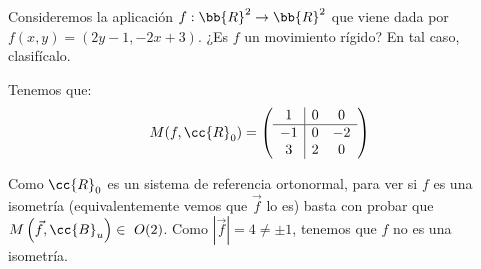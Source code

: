 \begin{ejercicio}
    Consideremos la aplicación $f : \bb{R}^2 \to \bb{R}^2$ que viene dada por $f(x, y) = (2y - 1, -2x + 3)$. ¿Es $f$ un movimiento rígido? En tal caso, clasifícalo.

    Tenemos que:
    \begin{equation*}
        M(f,\cc{R}_0) = \left(
        \begin{array}{c|cc}
            1 & 0 & 0 \\ \hline
            -1 & 0 & -2 \\
            3 & 2 & 0 \\
        \end{array}
        \right)
    \end{equation*}

    Como $\cc{R}_0$ es un sistema de referencia ortonormal, para ver si $f$ es una isometría (equivalentemente vemos que $\vec{f}$ lo es) basta con probar que
    $M\left(\vec{f}, \cc{B}_u\right)\in~O(2)$. Como $\left|\vec{f}\right|=4\neq \pm 1$, tenemos que $f$ no es una isometría.
\end{ejercicio}

